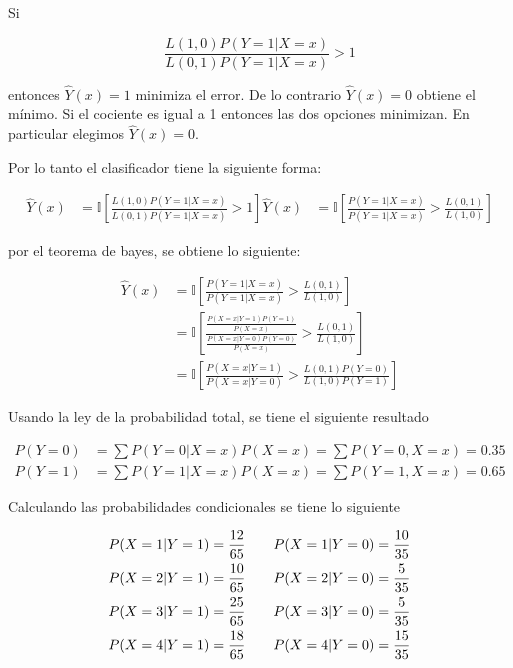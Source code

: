 Si

\begin{equation*}
    \frac{L(1,0)P(Y=1|X=x)}{L(0,1)P(Y=1|X=x)} > 1
\end{equation*}

entonces $\hat{Y}(x)=1$ minimiza el error. De lo contrario $\hat{Y}(x)=0$ obtiene el mínimo. Si el cociente es igual a 1 entonces las dos opciones minimizan. En particular elegimos $\hat{Y}(x)=0$.

Por lo tanto el clasificador tiene la siguiente forma:

\begin{align*}
    \hat{Y}(x) & = \mathbb{I} \left [\frac{L(1,0)P(Y=1|X=x)}{L(0,1)P(Y=1|X=x)} > 1 \right ]
    \hat{Y}(x) & = \mathbb{I} \left [\frac{P(Y=1|X=x)}{P(Y=1|X=x)} > \frac{L(0,1)}{L(1,0)} \right ]
\end{align*}

por el teorema de bayes, se obtiene lo siguiente:

\begin{align*}
    \hat{Y}(x) & = \mathbb{I} \left [\frac{P(Y=1|X=x)}{P(Y=1|X=x)} > \frac{L(0,1)}{L(1,0)} \right ]                                           \\
               & = \mathbb{I} \left [\frac{\frac{P(X=x|Y=1)P(Y=1)}{P(X=x)}}{\frac{P(X=x|Y=0)P(Y=0)}{P(X=x)}} > \frac{L(0,1)}{L(1,0)} \right ] \\
               & = \mathbb{I} \left [ \frac{P(X=x|Y=1)}{P(X=x|Y=0)}  > \frac{L(0,1)P(Y=0)}{L(1,0)P(Y=1)}\right ]
\end{align*}

Usando la ley de la probabilidad total, se tiene el siguiente resultado

\begin{align*}
    P(Y=0) & = \sum P(Y=0|X=x)P(X=x) = \sum P(Y=0,X=x) = 0.35 \\
    P(Y=1) & = \sum P(Y=1|X=x)P(X=x) = \sum P(Y=1,X=x) = 0.65
\end{align*}

Calculando las probabilidades condicionales se tiene lo siguiente

\begin{align*}
    P(X=1|Y=1)=\frac{12}{65} & \qquad P(X=1|Y=0)=\frac{10}{35} \\
    P(X=2|Y=1)=\frac{10}{65} & \qquad P(X=2|Y=0)=\frac{5}{35}  \\
    P(X=3|Y=1)=\frac{25}{65} & \qquad P(X=3|Y=0)=\frac{5}{35}  \\
    P(X=4|Y=1)=\frac{18}{65} & \qquad P(X=4|Y=0)=\frac{15}{35}
\end{align*}

